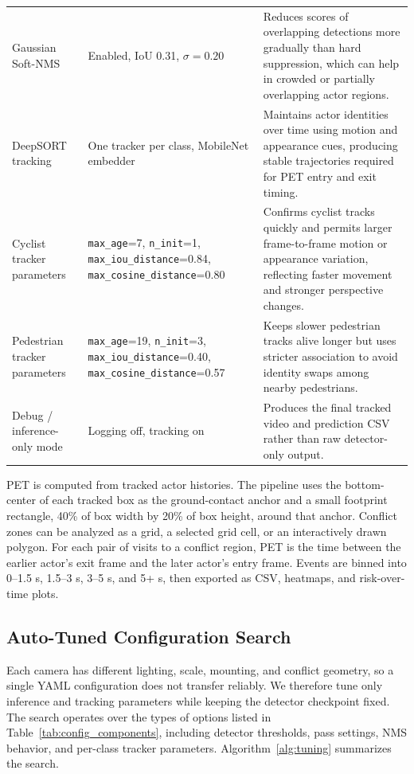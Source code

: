 \documentclass[conference]{IEEEtran}
\begin{document}
\begin{table}[t]
\begin{tabularx}{\textwidth}{p{}p{}X}
Gaussian Soft-NMS & Enabled, IoU 0.31, $\sigma=0.20$ & Reduces scores of overlapping detections more gradually than hard suppression, which can help in crowded or partially overlapping actor regions. \\
DeepSORT tracking & One tracker per class, MobileNet embedder & Maintains actor identities over time using motion and appearance cues, producing stable trajectories required for PET entry and exit timing. \\
Cyclist tracker parameters & \texttt{max\_age}=7, \texttt{n\_init}=1, \texttt{max\_iou\_distance}=0.84, \texttt{max\_cosine\_distance}=0.80 & Confirms cyclist tracks quickly and permits larger frame-to-frame motion or appearance variation, reflecting faster movement and stronger perspective changes. \\
Pedestrian tracker parameters & \texttt{max\_age}=19, \texttt{n\_init}=3, \texttt{max\_iou\_distance}=0.40, \texttt{max\_cosine\_distance}=0.57 & Keeps slower pedestrian tracks alive longer but uses stricter association to avoid identity swaps among nearby pedestrians. \\
Debug / inference-only mode & Logging off, tracking on & Produces the final tracked video and prediction CSV rather than raw detector-only output. \\
\bottomrule
\end{tabularx}
\end{table}

PET is computed from tracked actor histories. The pipeline uses the bottom-center of each tracked box as the ground-contact anchor and a small footprint rectangle, 40\% of box width by 20\% of box height, around that anchor. Conflict zones can be analyzed as a grid, a selected grid cell, or an interactively drawn polygon. For each pair of visits to a conflict region, PET is the time between the earlier actor's exit frame and the later actor's entry frame. Events are binned into 0--1.5 s, 1.5--3 s, 3--5 s, and 5+ s, then exported as CSV, heatmaps, and risk-over-time plots.

\subsection{Auto-Tuned Configuration Search}

Each camera has different lighting, scale, mounting, and conflict geometry, so a single YAML configuration does not transfer reliably. We therefore tune only inference and tracking parameters while keeping the detector checkpoint fixed. The search operates over the types of options listed in Table~\ref{tab:config_components}, including detector thresholds, pass settings, NMS behavior, and per-class tracker parameters. Algorithm~\ref{alg:tuning} summarizes the search.
\end{document}

